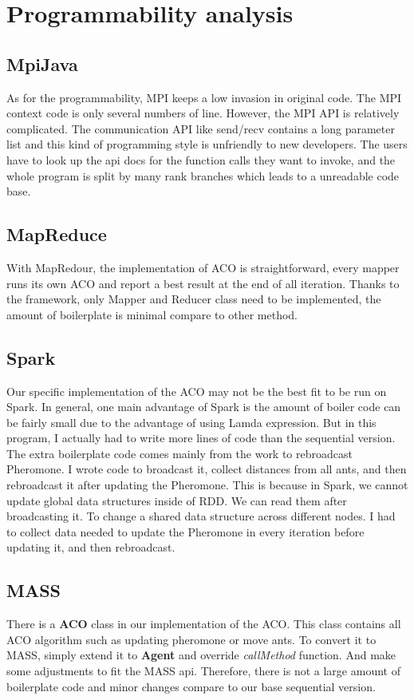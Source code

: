 \documentclass[11pt, letterpaper]{article}
\begin{document}
	\section {Programmability analysis}
	
	
	\subsection{MpiJava}
	As for the programmability, MPI keeps a low invasion in original code. The MPI context code is only several numbers of line. However, the MPI API is relatively complicated. The communication API like send/recv contains a long parameter list and this kind of programming style is unfriendly to new developers. The users have to look up the api docs for the function calls they want to invoke, and the whole program is split by many rank branches which leads to a unreadable code base.
	
	\subsection{MapReduce}
	With MapRedour, the implementation of ACO is straightforward, every mapper runs its own ACO and report a best result at the end of all iteration. Thanks to the framework, only Mapper and Reducer class need to be implemented, the amount of boilerplate is minimal compare to other method.
	
	\subsection{Spark}
	
	Our specific implementation of the ACO may not be the best fit to be run on Spark. In general, one main advantage of Spark is the amount of boiler code can be fairly small due to the advantage of using Lamda expression. But in this program, I actually had to write more lines of code than the sequential version. The extra boilerplate code comes mainly from the work to rebroadcast Pheromone. I wrote code to broadcast it, collect distances from all ants, and then rebroadcast it after updating the Pheromone. This is because in Spark, we cannot update global data structures inside of RDD. We can read them after broadcasting it. To change a shared data structure across different nodes. I had to collect data needed to update the Pheromone in every iteration before updating it, and then rebroadcast. 
	
	\subsection{MASS}
	There is a \textbf{ACO} class in our implementation of the ACO. This class contains all ACO algorithm such as updating pheromone or move ants. To convert it to MASS, simply extend it to \textbf{Agent} and override \textit{callMethod} function. And make some adjustments to fit the MASS api. Therefore, there is not a large amount of boilerplate code and minor changes compare to our base sequential version. 
	
\end{document}

